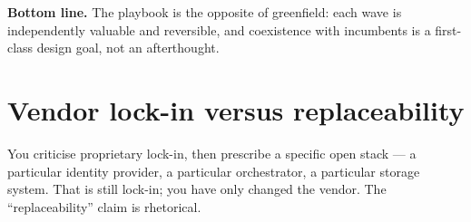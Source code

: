 \documentclass[11pt,a4paper,twoside]{book}
\begin{document}
\begin{answerbox}[Response O4.1]
\textbf{Bottom line.} The playbook is the opposite of greenfield: each wave
is independently valuable and reversible, and coexistence with incumbents is
a first-class design goal, not an afterthought.
\end{answerbox}

\section{Vendor lock-in versus replaceability}
\label{sec:arg-lockin}

\begin{questionbox}
You criticise proprietary lock-in, then prescribe a specific open stack ---
a particular identity provider, a particular orchestrator, a particular
storage system. That is still lock-in; you have only changed the vendor. The
``replaceability'' claim is rhetorical.
\end{questionbox}
\end{document}

